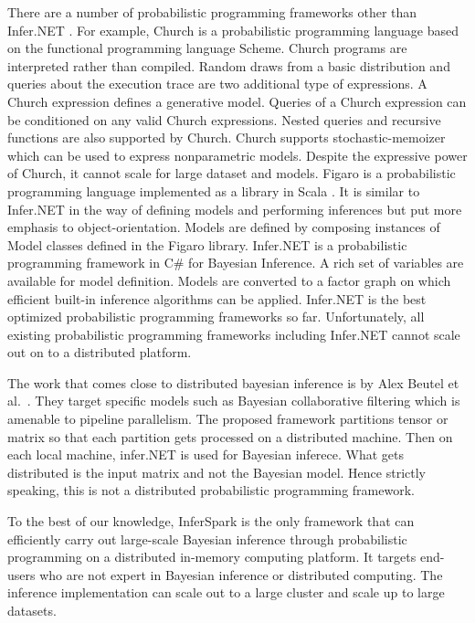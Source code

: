 There are a number of probabilistic programming frameworks other than
Infer.NET \cite{InferNET14}.  For example, Church \cite{GMR+08} is a
probabilistic programming language based on the functional programming
language Scheme.  Church programs are interpreted rather than compiled.
Random draws from a basic distribution and queries about the execution trace
are two additional type of expressions. A Church expression defines a
generative model. Queries of a Church expression can be conditioned on any
valid Church expressions. Nested queries and recursive functions are also
supported by Church. Church supports stochastic-memoizer which can be used to
express nonparametric models.  Despite the expressive power of Church, it
cannot scale for large dataset and models.  Figaro is a probabilistic
programming language implemented as a library in Scala \cite{Figaro}.  It is
similar to Infer.NET in the way of defining models and performing inferences
but put more emphasis to object-orientation. Models are defined by composing
instances of Model classes defined in the Figaro library.  Infer.NET is a
probabilistic programming framework in C\# for Bayesian Inference. A rich set
of variables are available for model definition. Models are converted to a
factor graph on which efficient built-in inference algorithms can be applied.
Infer.NET is the best optimized probabilistic programming frameworks so far.
Unfortunately, all existing probabilistic programming frameworks including
Infer.NET cannot scale out on to a distributed platform.

The work that comes close to distributed bayesian inference is by
Alex Beutel et al.~\cite{BeutelTKFPX14,beutel2014elastic}. They target
specific models such as Bayesian collaborative filtering which is amenable to
pipeline parallelism. The proposed framework partitions tensor or matrix 
so that each partition gets processed on a distributed machine. Then
on each local machine, infer.NET is used for Bayesian inferece. 
What gets distributed is the input matrix and not the Bayesian model. Hence
strictly speaking, this is not a distributed probabilistic programming
framework. 

To the best of our knowledge, InferSpark is the only framework that can
efficiently carry out large-scale Bayesian inference through probabilistic
programming on a distributed in-memory computing platform. It targets
end-users who are not expert in Bayesian inference or distributed computing.
The inference implementation can scale out to a large cluster and scale up to
large datasets.

